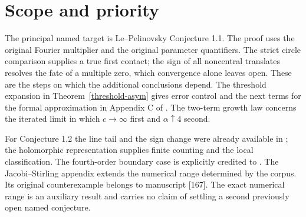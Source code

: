 \documentclass[11pt]{article}
\theoremstyle{plain}\newtheorem{theorem}{Theorem}[section]\newtheorem{lemma}[theorem]{Lemma}\newtheorem{corollary}[theorem]{Corollary}\newtheorem{proposition}[theorem]{Proposition}
\numberwithin{equation}{section}
\begin{document}
\section*{Scope and priority}
The principal named target is Le--Pelinovsky Conjecture 1.1. The proof uses the original Fourier multiplier and the original parameter quantifiers. The strict circle comparison supplies a true first contact; the sign of all noncentral translates resolves the fate of a multiple zero, which convergence alone leaves open. These are the steps on which the additional conclusions depend. The threshold expansion in Theorem~\ref{threshold-asym} gives error control and the next terms for the formal approximation in Appendix C of \cite{lp}. The two-term growth law concerns the iterated limit in which $c\to\infty$ first and $\alpha\uparrow4$ second.
  
For Conjecture 1.2 the line tail and the sign change were already available in \cite{sk}; the holomorphic representation supplies finite counting and the local classification. The fourth-order boundary case is explicitly credited to \cite{lp}. The Jacobi--Stirling appendix extends the numerical range determined by the corpus. Its original counterexample belongs to manuscript [167]. The exact numerical range is an auxiliary result and carries no claim of settling a second previously open named conjecture.
\end{document}
